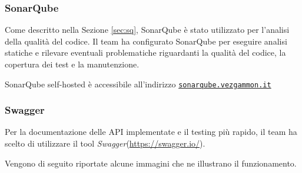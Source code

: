 \documentclass{article}
\begin{document}
\subsubsection{SonarQube}
Come descritto nella Sezione \ref{sec:sq}, SonarQube è stato utilizzato per l'analisi della qualità del codice. Il team ha 
configurato SonarQube per eseguire analisi statiche e rilevare eventuali problematiche riguardanti la qualità del codice, 
la copertura dei test e la manutenzione.

SonarQube self-hosted è accessibile all'indirizzo \href{https://sonarqube.vezgammon.it}{\texttt{sonarqube.vezgammon.it}}

\newpage

\subsubsection{Swagger} \label{sec:swagger}

Per la documentazione delle API implementate e il testing più rapido, il team ha scelto di utilizzare il tool 
\textit{Swagger}(\url{https://swagger.io/}).

Vengono di seguito riportate alcune immagini che ne illustrano il funzionamento.
\end{document}
